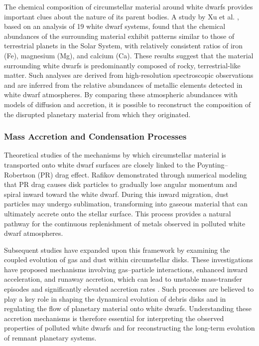 The chemical composition of circumstellar material around white dwarfs provides important clues about the nature of its parent bodies. A study by Xu et al. \cite{xu2019}, based on an analysis of 19 white dwarf systems, found that the chemical abundances of the surrounding material exhibit patterns similar to those of terrestrial planets in the Solar System, with relatively consistent ratios of iron (Fe), magnesium (Mg), and calcium (Ca). These results suggest that the material surrounding white dwarfs is predominantly composed of rocky, terrestrial-like matter. Such analyses are derived from high-resolution spectroscopic observations and are inferred from the relative abundances of metallic elements detected in white dwarf atmospheres. By comparing these atmospheric abundances with models of diffusion and accretion, it is possible to reconstruct the composition of the disrupted planetary material from which they originated.

\subsubsection{Mass Accretion and Condensation Processes}

Theoretical studies of the mechanisms by which circumstellar material is transported onto white dwarf surfaces are closely linked to the Poynting--Robertson (PR) drag effect. Rafikov \cite{rafikov2011} demonstrated through numerical modeling that PR drag causes disk particles to gradually lose angular momentum and spiral inward toward the white dwarf. During this inward migration, dust particles may undergo sublimation, transforming into gaseous material that can ultimately accrete onto the stellar surface. This process provides a natural pathway for the continuous replenishment of metals observed in polluted white dwarf atmospheres.

Subsequent studies have expanded upon this framework by examining the coupled evolution of gas and dust within circumstellar disks. These investigations have proposed mechanisms involving gas--particle interactions, enhanced inward acceleration, and runaway accretion, which can lead to unstable mass-transfer episodes and significantly elevated accretion rates \cite{rafikov2011}. Such processes are believed to play a key role in shaping the dynamical evolution of debris disks and in regulating the flow of planetary material onto white dwarfs. Understanding these accretion mechanisms is therefore essential for interpreting the observed properties of polluted white dwarfs and for reconstructing the long-term evolution of remnant planetary systems.

